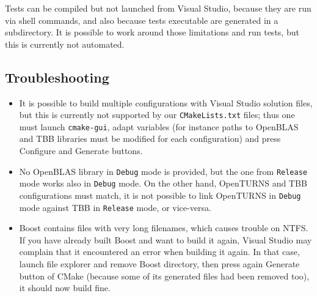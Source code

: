 Tests can be compiled but not launched from Visual Studio, because they are run via shell commands, and also because tests executable are
generated in a subdirectory.  It is possible to work around those limitations and run tests, but this is currently not automated.

\subsection{Troubleshooting}
\begin{itemize}
\item It is possible to build multiple configurations with Visual Studio solution files, but this is currently not supported by
our \texttt{CMakeLists.txt} files; thus one must launch \texttt{cmake-gui}, adapt variables (for instance paths to OpenBLAS
and TBB libraries must be modified for each configuration) and press \textsf{Configure} and \textsf{Generate} buttons.
\item No OpenBLAS library in \texttt{Debug} mode is provided, but the one from \texttt{Release} mode works also in \texttt{Debug}
mode.  On the other hand, OpenTURNS and TBB configurations must match, it is not possible to link OpenTURNS in \texttt{Debug} mode
against TBB in \texttt{Release} mode, or vice-versa.
\item Boost contains files with very long filenames, which causes trouble on NTFS.  If you have already built Boost and want to
build it again, Visual Studio may complain that it encountered an error when building it again.  In that case, launch file
explorer and remove Boost directory, then press again \textsf{Generate} button of CMake (because some of its generated files had
been removed too), it should now build fine.
\end{itemize}
